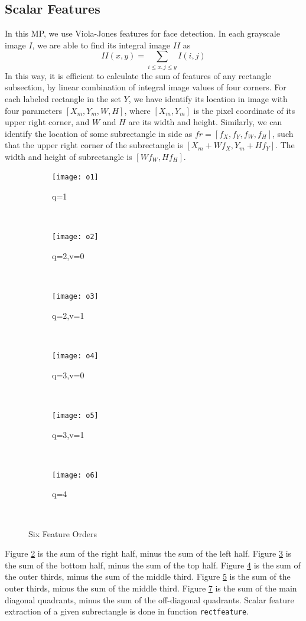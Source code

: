 \documentclass{article}
\begin{document}
	\subsection{Scalar Features}
	\justify In this MP, we use Viola-Jones features for face detection. In each grayscale image $I$, we are able to find its integral image $II$ as 
	\begin{equation}
	II(x,y)=\sum_{i\leq x,j\leq y}I(i,j)
	\end{equation}
	\justify In this way, it is efficient to calculate the sum of features of any rectangle subsection, by linear combination of integral image values of four corners.	For each labeled rectangle in the set $Y$, we have identify its location in image with four parameters $[X_m,Y_m,W,H]$, where $[X_m,Y_m]$ is the pixel coordinate of its upper right corner, and $W$ and $H$ are its width and height. Similarly, we can identify the location of some subrectangle in side as $fr=[f_X,f_Y,f_W,f_H]$, such that the upper right corner of the subrectangle is $[X_m+Wf_X,Y_m+Hf_Y]$. The width and height of subrectangle is $[Wf_W,Hf_H]$.\\
	\begin{figure}[H]
		\vspace{-1em}
		\centering
		\begin{subfigure}{0.14\textwidth}
			\centering
			\texttt{[image: o1]}
			\caption{q=1}
			\label{o1}
		\end{subfigure}~
		\begin{subfigure}{0.14\textwidth}
			\centering
			\texttt{[image: o2]}
			\caption{q=2,v=0}
			\label{o2}
		\end{subfigure}~
		\begin{subfigure}{0.14\textwidth}
			\centering
			\texttt{[image: o3]}
			\caption{q=2,v=1}
			\label{o3}
		\end{subfigure}~
		\begin{subfigure}{0.14\textwidth}
			\centering
			\texttt{[image: o4]}
			\caption{q=3,v=0}
			\label{o4}
		\end{subfigure}~
		\begin{subfigure}{0.14\textwidth}
			\centering
			\texttt{[image: o5]}
			\caption{q=3,v=1}
			\label{o5}
		\end{subfigure}~
		\begin{subfigure}{0.14\textwidth}
			\centering
			\texttt{[image: o6]}
			\caption{q=4}
			\label{o6}
		\end{subfigure}~
	\caption{Six Feature Orders}
	\vspace{-1.5em}
	\end{figure}
	\justify Figure \ref{o2}  is the sum of the right half, minus the sum of the left half. Figure \ref{o3} is the sum of the bottom half, minus the sum of the top half. Figure \ref{o4} is the sum of the outer thirds, minus the sum of the middle third. Figure \ref{o5} is the sum of the outer thirds, minus the sum of the middle third. Figure \ref{o6} is the sum of the main diagonal quadrants, minus the sum of the off-diagonal quadrants. Scalar feature extraction of a given subrectangle is done in function \texttt{rectfeature}.\\
	
\end{document}
